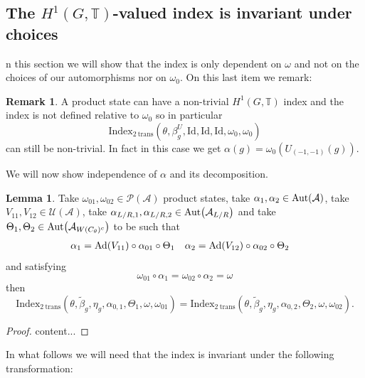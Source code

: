 \documentclass[12pt,a4paper,twoside]{article}
\let\originalleft\left
\let\originalright\right
\renewcommand{\left}{\mathopen{}\mathclose\bgroup\originalleft}
\renewcommand{\right}{\aftergroup\egroup\originalright}
\newcommand{\UU}{\mathcal U}
\newcommand{\PP}{\mathcal P}
\newcommand{\TT}{\mathbb T}
\renewcommand{\AA}{\mathcal A}
\newcommand{\Ad}[1]{\textrm{Ad}\left(#1\right)}
\newcommand{\Aut}[1]{\textrm{Aut}\left(#1\right)}
\theoremstyle{definition}
\newtheorem{lemma}[theorem]{Lemma}
\newtheorem{remark}[theorem]{Remark}
\numberwithin{equation}{section}
\begin{document}
\subsection{The $H^1(G,\TT)$-valued index is invariant under choices}
n this section we will show that the index is only dependent on $\omega$ and not on the choices of our automorphisms nor on $\omega_0$. On this last item we remark:
\begin{remark}
	A product state can have a non-trivial $H^1(G,\TT)$ index and the index is not defined relative to $\omega_0$ so in particular
	\begin{equation}
		\textrm{Index}_{2\:\text{trans}}(\theta,\beta_g^U,\textrm{Id},\textrm{Id},\textrm{Id},\omega_0,\omega_0)
	\end{equation}
	can still be non-trivial. In fact in this case we get $\alpha(g)=\omega_0(U_{(-1,-1)}(g))$.
\end{remark}
We will now show independence of $\alpha$ and its decomposition.
\begin{lemma}
	Take $\omega_{01},\omega_{02}\in\PP(\AA)$ product states, take $\alpha_1,\alpha_2\in\Aut{\AA}$, take $V_{11},V_{12}\in\UU(\AA)$, take $\alpha_{L/R,1},\alpha_{L/R,2}\in\Aut{\AA_{L/R}}$ and take $\Theta_1,\Theta_2\in \Aut{\AA_{W(C_\theta)^c}}$ to be such that
	\begin{align}
		\alpha_1&=\Ad{V_{11}}\circ\alpha_{01}\circ\Theta_1&\alpha_2&=\Ad{V_{12}}\circ\alpha_{02}\circ \Theta_2
	\end{align}
	and satisfying
	\begin{equation}
		\omega_{01}\circ\alpha_1=\omega_{02}\circ\alpha_2=\omega
	\end{equation}
	then
	\begin{equation}
		\textrm{Index}_{2\:\text{trans}}(\theta,\tilde{\beta}_g,\eta_g,\alpha_{0,1},\Theta_1,\omega,\omega_{01})=\textrm{Index}_{2\:\text{trans}}(\theta,\tilde{\beta}_g,\eta_g,\alpha_{0,2},\Theta_2,\omega,\omega_{02}).
	\end{equation}
\end{lemma}
\begin{proof}
	content...
\end{proof}
In what follows we will need that the index is invariant under the following transformation:
\end{document}

